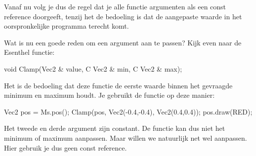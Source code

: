 Vanaf nu volg je dus de regel dat je alle functie argumenten als een const reference doorgeeft, tenzij het de bedoeling is dat de aangepaste waarde in het oorspronkelijke programma terecht komt.

Wat is nu een goede reden om een argument aan te passen? Kijk even naar de Esenthel functie:
\begin{code}
void Clamp(Vec2 & value, C Vec2 & min, C Vec2 & max);
\end{code}

Het is de bedoeling dat deze functie de eerste waarde binnen het gevraagde minimum en maximum houdt. Je gebruikt de functie op deze manier:

\begin{code}
Vec2 pos = Ms.pos();
Clamp(pos, Vec2(-0.4,-0.4), Vec2(0.4,0.4));
pos.draw(RED);
\end{code}

Het tweede en derde argument zijn constant. De functie  kan dus niet het minimum of maximum aanpassen. Maar  willen we natuurlijk net wel aanpassen. Hier gebruik je dus geen const reference.